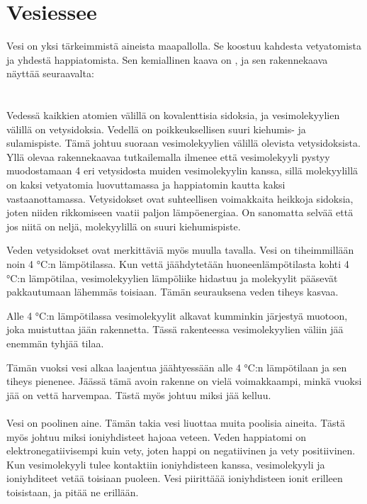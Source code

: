\documentclass[12pt]{article}
\begin{document}
\section*{Vesiessee}

\renewcommand{\section}[2]{}

Vesi on yksi tärkeimmistä aineista maapallolla. Se koostuu kahdesta vetyatomista ja yhdestä happiatomista. Sen kemiallinen kaava on , ja
sen rakennekaava näyttää seuraavalta:
\\

\\
\\

Vedessä kaikkien atomien välillä on kovalenttisia sidoksia, ja vesimolekyylien välillä on vetysidoksia.
Vedellä on poikkeuksellisen suuri kiehumis- ja sulamispiste. Tämä johtuu suoraan vesimolekyylien välillä olevista vetysidoksista.
Yllä olevaa rakennekaavaa tutkailemalla ilmenee että vesimolekyyli pystyy muodostamaan 4 eri vetysidosta muiden vesimolekyylin kanssa, sillä
molekyylillä on kaksi vetyatomia luovuttamassa ja happiatomin kautta kaksi vastaanottamassa.
Vetysidokset ovat suhteellisen voimakkaita heikkoja sidoksia, joten niiden rikkomiseen vaatii paljon lämpöenergiaa. On sanomatta selvää että jos niitä on neljä,
molekyylillä on suuri kiehumispiste.

Veden vetysidokset ovat merkittäviä myös muulla tavalla. Vesi on tiheimmillään noin 4 °C:n lämpötilassa. 
Kun vettä jäähdytetään huoneenlämpötilasta kohti 4 °C:n lämpötilaa, vesimolekyylien lämpöliike hidastuu ja molekyylit pääsevät pakkautumaan lähemmäs toisiaan. Tämän seurauksena veden tiheys kasvaa.

Alle 4 °C:n lämpötilassa vesimolekyylit alkavat kumminkin järjestyä muotoon, joka muistuttaa jään rakennetta. Tässä rakenteessa vesimolekyylien väliin jää enemmän tyhjää tilaa.

Tämän vuoksi vesi alkaa laajentua jäähtyessään alle 4 °C:n lämpötilaan ja sen tiheys pienenee. Jäässä tämä avoin rakenne on vielä voimakkaampi, minkä vuoksi jää on vettä harvempaa. Tästä myös johtuu miksi jää kelluu.
\\
\\
Vesi on poolinen aine. Tämän takia vesi liuottaa muita poolisia aineita. 
Tästä myös johtuu miksi ioniyhdisteet hajoaa veteen. Veden happiatomi on elektronegatiivisempi kuin vety, joten
happi on negatiivinen ja vety positiivinen. Kun vesimolekyyli tulee kontaktiin ioniyhdisteen kanssa, vesimolekyyli ja ioniyhditeet vetää toisiaan puoleen.
Vesi piirittäää ioniyhdisteen ionit erilleen toisistaan, ja pitää ne erillään.



\end{document}
